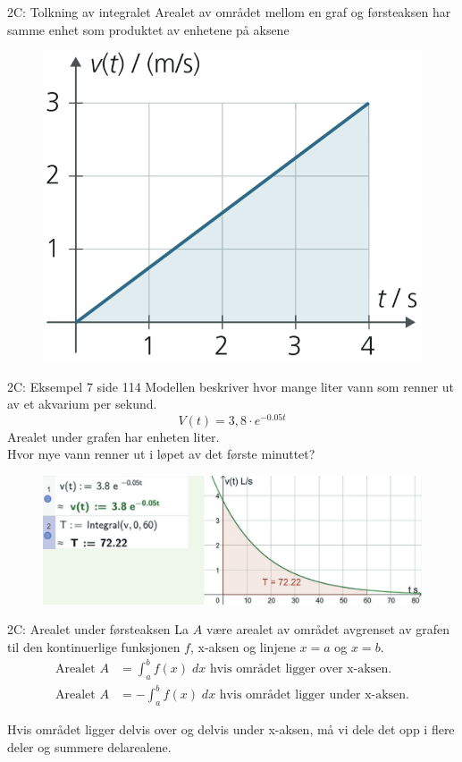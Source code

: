 \redheader
\begin{frame}{2C: Tolkning av integralet}
Arealet av området mellom en graf og førsteaksen har samme enhet som produktet av enhetene på aksene
    \begin{figure}
        \centering
        \includegraphics[width=0.5\linewidth]{R2-K2C-1.png}
    \end{figure}
\end{frame}

\greenheader
\begin{frame}{2C: Eksempel 7 side 114}
Modellen beskriver hvor mange liter vann som renner ut av et akvarium per sekund.
\begin{equation*}
    V(t)=3,8\cdot e^{-0.05t} 
\end{equation*}
Arealet under grafen har enheten liter.\\

Hvor mye vann renner ut i løpet av det første minuttet? 
\begin{figure}
    \centering
    \includegraphics[width=0.8\linewidth]{R2-K2C-2.png}
\end{figure}
\end{frame}

\redheader
\begin{frame}{2C: Arealet under førsteaksen}
    La $A$ være arealet av området avgrenset av grafen til den kontinuerlige funksjonen $f$, x-aksen og linjene $x=a$ og $x=b$.\\
    \begin{align*} 
    \text{Arealet }  A&=\int_a^bf(x)\;dx \text{   hvis området ligger over x-aksen.}\\
       \text{Arealet }  A&=-\int_a^bf(x)\;dx \text{   hvis området ligger under x-aksen.}
       \end{align*}
       
    \medskip
    Hvis området ligger delvis over og delvis under x-aksen, må vi dele det opp i flere deler og summere delarealene.
\end{frame}


